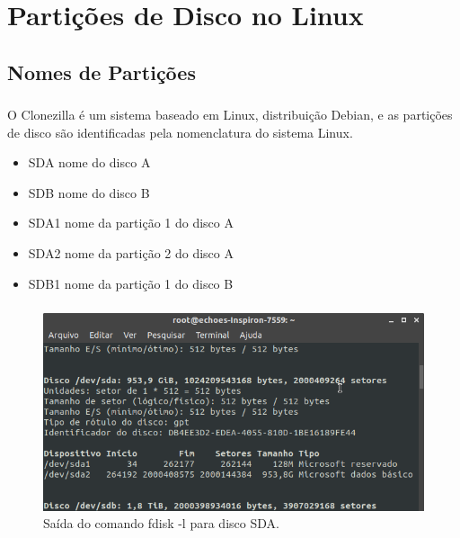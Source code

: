 \documentclass{beamer}
\begin{document}
\section{Partições de Disco no Linux}
\subsection{Nomes de Partições}
\begin{frame}
    \frametitle{\insertsection}
    \framesubtitle{\insertsubsection}
     \begin{block}{\insertsubsection}
  	\justifying
  O Clonezilla é um sistema baseado em Linux, distribuição Debian, e as partições de disco são identificadas pela nomenclatura do sistema Linux.
   
   \begin{itemize}[<+-| alert@+>]
        \item SDA nome do disco A
        \item SDB nome do disco B
        \item SDA1 nome da partição 1 do disco A
        \item SDA2 nome da partição 2 do disco A
        \item SDB1 nome da partição 1 do disco B
    \end{itemize}
\end{block}
\end{frame}
\begin{frame}[plain,c]
    \frametitle{\insertsection}
    \framesubtitle{\insertsubsection}
    \begin{figure}
        \centering
        \includegraphics[scale=0.6]{images/discos1.png}
        \caption{Saída do comando fdisk -l para disco SDA.}
    \end{figure}  
\end{frame}
\end{document}
